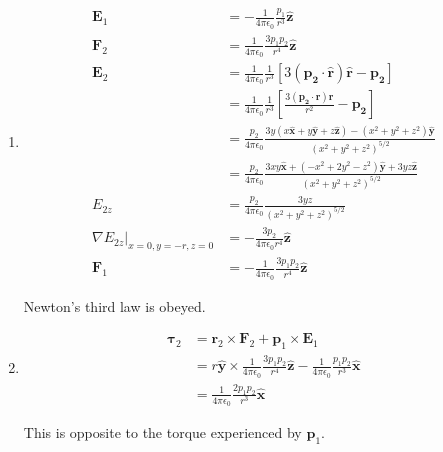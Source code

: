 \documentclass{article}
\renewcommand{\vec}[1]{\boldsymbol{\mathbf{#1}}}
\newcommand{\uvec}[1]{\hat{\vec{#1}}}
\newcommand{\ke}{\frac{1}{4 \pi \epsilon_0}}
\begin{document}
\begin{enumerate}
  \item

        \begin{align*}
          \vec{E}_1                                            & = -\ke \frac{p_1}{r^3} \uvec{z}                                                                                                          \\
          \vec{F}_2                                            & = \ke \frac{3 p_1 p_2}{r^4} \uvec{z}                                                                                                     \\
          \vec{E}_2                                            & = \ke \frac{1}{r^3} [3 (\vec{p_2} \cdot \uvec{r}) \uvec{r} - \vec{p_2}]                                                                  \\
                                                               & = \ke \frac{1}{r^3} \left[ \frac{3 (\vec{p_2} \cdot \vec{r}) \vec{r}}{r^2} - \vec{p_2} \right]                                           \\
                                                               & = \frac{p_2}{4 \pi \epsilon_0} \frac{3 y (x \uvec{x} + y \uvec{y} + z \uvec{z}) - (x^2 + y^2 + z^2) \uvec{y}}{(x^2 + y^2 + z^2)^{5 / 2}} \\
                                                               & = \frac{p_2}{4 \pi \epsilon_0} \frac{3 x y \uvec{x} + (-x^2 + 2 y^2 - z^2) \uvec{y} + 3 y z \uvec{z}}{(x^2 + y^2 + z^2)^{5 / 2}}         \\
          E_{2 z}                                              & = \frac{p_2}{4 \pi \epsilon_0} \frac{3 y z}{(x^2 + y^2 + z^2)^{5 / 2}}                                                                   \\
          \left. \nabla E_{2 z} \right|_{x = 0, y = -r, z = 0} & = -\frac{3 p_2}{4 \pi \epsilon_0 r^4} \uvec{z}                                                                                           \\
          \vec{F}_1                                            & = -\ke \frac{3 p_1 p_2}{r^4} \uvec{z}
        \end{align*}

        Newton's third law is obeyed.

  \item

        \begin{align*}
          \vec{\tau}_2 & = \vec{r}_2 \times \vec{F}_2 + \vec{p}_1 \times \vec{E}_1                                 \\
                       & = r \uvec{y} \times \ke \frac{3 p_1 p_2}{r^4} \uvec{z} - \ke \frac{p_1 p_2}{r^3} \uvec{x} \\
                       & = \ke \frac{2 p_1 p_2}{r^3} \uvec{x}
        \end{align*}

        This is opposite to the torque experienced by $\vec{p}_1$.
\end{enumerate}
\end{document}

